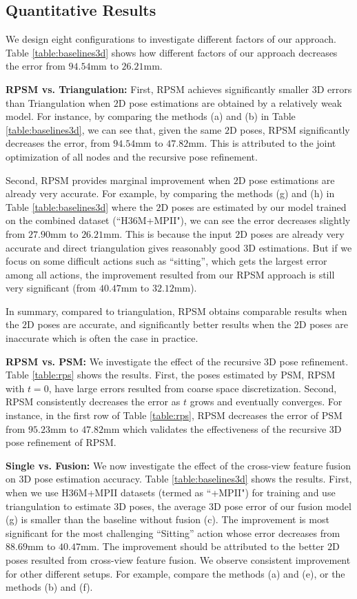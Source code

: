 \documentclass[10pt,twocolumn,letterpaper]{article}
\begin{document}
\subsection{Quantitative Results}
We design eight configurations to investigate different factors of our approach. Table \ref{table:baselines3d} shows how different factors of our approach decreases the error from $94.54$mm to $26.21$mm.

\textbf{RPSM vs. Triangulation:}
 First, RPSM achieves significantly smaller 3D errors than Triangulation when $2$D pose estimations are obtained by a relatively weak model. For instance, by comparing the methods (a) and (b) in Table \ref{table:baselines3d}, we can see that, given the same $2$D poses, RPSM significantly decreases the error, \ie from $94.54$mm to $47.82$mm. This is attributed to the joint optimization of all nodes and the recursive pose refinement. 

Second, RPSM provides marginal improvement when $2$D pose estimations are already very accurate. For example, by comparing  the methods (g) and (h) in Table \ref{table:baselines3d} where the $2$D poses are estimated by our model trained on the combined dataset (``H36M+MPII"), we can see the error decreases slightly from $27.90$mm to $26.21$mm. This is because the input $2$D poses are already very accurate and direct triangulation gives reasonably good $3$D estimations. But if we focus on some difficult actions such as ``sitting'', which gets the largest error among all actions, the improvement resulted from our RPSM approach is still very significant (from $40.47$mm to $32.12$mm). 

In summary, compared to triangulation, RPSM obtains comparable results when the $2$D poses are accurate, and significantly better results when the 2D poses are inaccurate which is often the case in practice.




\textbf{RPSM vs. PSM: }
We investigate the effect of the recursive $3$D pose refinement. Table \ref{table:rps} shows the results. First, the poses estimated by PSM, \ie RPSM with $t=0$, have large errors resulted from coarse space discretization. Second, RPSM consistently decreases the error as $t$ grows and eventually converges.
For instance, in the first row of Table \ref{table:rps}, RPSM decreases the error of PSM from $95.23$mm to $47.82$mm which validates the effectiveness of the recursive 3D pose refinement of RPSM.




\textbf{Single vs. Fusion: }
We now investigate the effect of the cross-view feature fusion on 3D pose estimation accuracy. Table \ref{table:baselines3d} shows the results. First, when we use H36M+MPII datasets (termed as ``+MPII") for training and use triangulation to estimate $3$D poses, the average $3$D pose error of our fusion model (g) is smaller than the baseline without fusion (c). The improvement is most significant for the most challenging ``Sitting'' action whose error decreases from $88.69$mm to $40.47$mm. The improvement should be attributed to the better $2$D poses resulted from cross-view feature fusion. We observe consistent improvement for other different setups. For example, compare the methods (a) and (e), or the methods (b) and (f).
\end{document}
